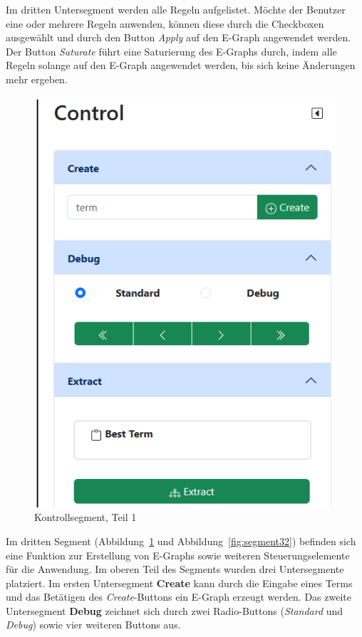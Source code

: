 Im dritten Untersegment werden alle Regeln aufgelistet. Möchte der Benutzer eine oder mehrere Regeln anwenden, können diese durch die Checkboxen ausgewählt und durch den 
Button \textit{Apply} auf den E-Graph angewendet werden. Der Button \textit{Saturate} führt eine Saturierung des E-Graphs durch, indem alle Regeln solange auf den E-Graph angewendet werden, bis sich keine Änderungen mehr ergeben.

\begin{figure}
    \vspace{-10mm}
    \begin{center}
      \includegraphics[scale=0.6]{../fig/control1.png}
    \end{center}
    \caption{Kontrollsegment, Teil 1}
    \label{fig:segment31}
\end{figure}

Im dritten Segment (Abbildung~\ref{fig:segment31} und Abbildung~\ref{fig:segment32}) befinden sich eine Funktion zur Erstellung von E-Graphs sowie weiteren Steuerungselemente für die Anwendung.
Im oberen Teil des Segments wurden drei Untersegmente platziert. Im ersten Untersegment \textbf{Create} kann durch die Eingabe eines Terms und das Betätigen des \textit{Create}-Buttons
ein E-Graph erzeugt werden. Das zweite Untersegment \textbf{Debug} zeichnet sich durch zwei Radio-Buttons (\textit{Standard} und \textit{Debug}) sowie vier weiteren Buttons aus. 

